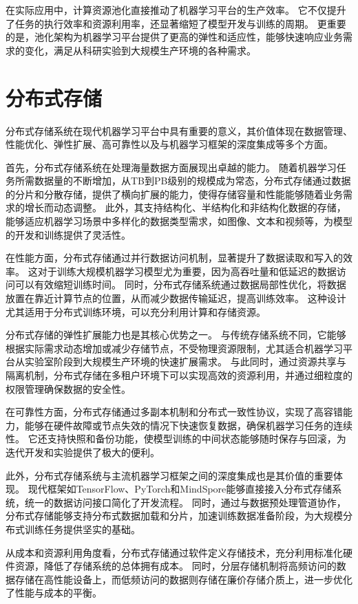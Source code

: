 在实际应用中，计算资源池化直接推动了机器学习平台的生产效率。
它不仅提升了任务的执行效率和资源利用率，还显著缩短了模型开发与训练的周期。
更重要的是，池化架构为机器学习平台提供了更高的弹性和适应性，能够快速响应业务需求的变化，满足从科研实验到大规模生产环境的各种需求。


\section{分布式存储}

分布式存储系统在现代机器学习平台中具有重要的意义，其价值体现在数据管理、性能优化、弹性扩展、高可靠性以及与机器学习框架的深度集成等多个方面。

首先，分布式存储系统在处理海量数据方面展现出卓越的能力。
随着机器学习任务所需数据量的不断增加，从TB到PB级别的规模成为常态，分布式存储通过数据的分片和分散存储，提供了横向扩展的能力，使得存储容量和性能能够随着业务需求的增长而动态调整。
此外，其支持结构化、半结构化和非结构化数据的存储，能够适应机器学习场景中多样化的数据类型需求，如图像、文本和视频等，为模型的开发和训练提供了灵活性。

在性能方面，分布式存储通过并行数据访问机制，显著提升了数据读取和写入的效率。
这对于训练大规模机器学习模型尤为重要，因为高吞吐量和低延迟的数据访问可以有效缩短训练时间。
同时，分布式存储系统通过数据局部性优化，将数据放置在靠近计算节点的位置，从而减少数据传输延迟，提高训练效率。
这种设计尤其适用于分布式训练环境，可以充分利用计算和存储资源。

分布式存储的弹性扩展能力也是其核心优势之一。
与传统存储系统不同，它能够根据实际需求动态增加或减少存储节点，不受物理资源限制，尤其适合机器学习平台从实验室阶段到大规模生产环境的快速扩展需求。
与此同时，通过资源共享与隔离机制，分布式存储在多租户环境下可以实现高效的资源利用，并通过细粒度的权限管理确保数据的安全性。

在可靠性方面，分布式存储通过多副本机制和分布式一致性协议，实现了高容错能力，能够在硬件故障或节点失效的情况下快速恢复数据，确保机器学习任务的连续性。
它还支持快照和备份功能，使模型训练的中间状态能够随时保存与回滚，为迭代开发和实验提供了极大的便利。

此外，分布式存储系统与主流机器学习框架之间的深度集成也是其价值的重要体现。
现代框架如TensorFlow、PyTorch和MindSpore能够直接接入分布式存储系统，统一的数据访问接口简化了开发流程。
同时，通过与数据预处理管道协作，分布式存储能够支持分布式数据加载和分片，加速训练数据准备阶段，为大规模分布式训练任务提供坚实的基础。

从成本和资源利用角度看，分布式存储通过软件定义存储技术，充分利用标准化硬件资源，降低了存储系统的总体拥有成本。
同时，分层存储机制将高频访问的数据存储在高性能设备上，而低频访问的数据则存储在廉价存储介质上，进一步优化了性能与成本的平衡。


